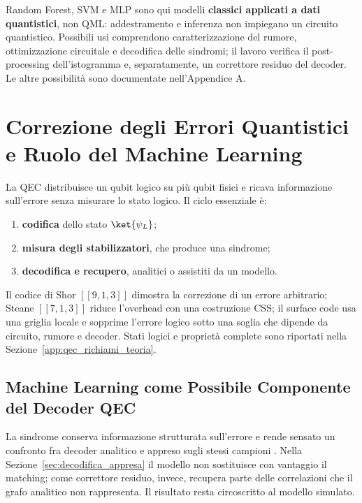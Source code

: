 \begin{onehalfspace}
Random Forest, \ac{SVM} e \ac{MLP} sono qui modelli \textbf{classici applicati
a dati quantistici}, non \ac{QML}: addestramento e inferenza non impiegano un
circuito quantistico. Possibili usi comprendono caratterizzazione del rumore,
ottimizzazione circuitale e decodifica delle sindromi; il lavoro verifica il
post-processing dell'istogramma e, separatamente, un correttore residuo del
decoder. Le altre possibilità sono documentate nell'Appendice A.

\section[Correzione degli Errori Quantistici e Ruolo del Machine Learning]{Correzione degli Errori Quantistici e Ruolo del Machine Learning}
\label{sec:qec_overview}

La \ac{QEC} distribuisce un qubit logico su più qubit fisici e ricava
informazione sull'errore senza misurare lo stato logico. Il ciclo essenziale è:
\begin{enumerate}
    \item \textbf{codifica} dello stato $\ket{\psi_L}$;
    \item \textbf{misura degli stabilizzatori}, che produce una sindrome;
    \item \textbf{decodifica e recupero}, analitici o assistiti da un modello.
\end{enumerate}
Il codice di Shor $[[9,1,3]]$ dimostra la correzione di un errore arbitrario;
Steane $[[7,1,3]]$ riduce l'overhead con una costruzione \ac{CSS}; il surface
code usa una griglia locale e sopprime l'errore logico sotto una soglia che
dipende da circuito, rumore e decoder. Stati logici e proprietà complete sono
riportati nella Sezione~\ref{app:qec_richiami_teoria}.

\subsection{Machine Learning come Possibile Componente del Decoder QEC}
\label{sec:qec_ml}

La sindrome conserva informazione strutturata sull'errore e rende sensato un
confronto fra decoder analitico e appreso sugli stessi campioni
\cite{torlaiMelko2017,alphaqubit2024}. Nella
Sezione~\ref{sec:decodifica_appresa} il modello non sostituisce con vantaggio il
matching; come correttore residuo, invece, recupera parte delle correlazioni che
il grafo analitico non rappresenta. Il risultato resta circoscritto al modello
simulato.


\end{onehalfspace}

